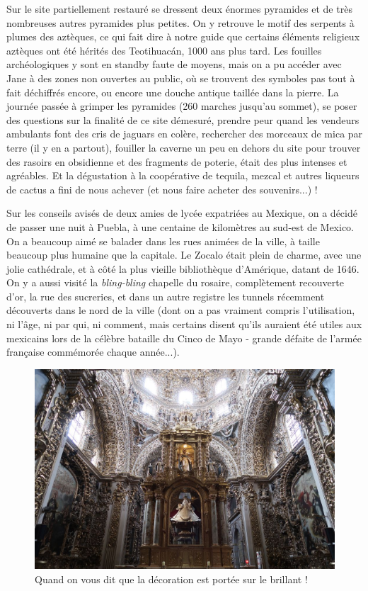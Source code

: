 Sur le site partiellement restauré se dressent deux énormes pyramides et
de très nombreuses autres pyramides plus petites. On y retrouve le motif
des serpents à plumes des aztèques, ce qui fait dire à notre guide que
certains éléments religieux aztèques ont été hérités des Teotihuacán,
1000 ans plus tard. Les fouilles archéologiques y sont en standby faute
de moyens, mais on a pu accéder avec Jane à des zones non ouvertes au
public, où se trouvent des symboles pas tout à fait déchiffrés encore,
ou encore une douche antique taillée dans la pierre. La journée passée à
grimper les pyramides (260 marches jusqu'au sommet), se poser des
questions sur la finalité de ce site démesuré, prendre peur quand les
vendeurs ambulants font des cris de jaguars en colère, rechercher des
morceaux de mica par terre (il y en a partout), fouiller la caverne un
peu en dehors du site pour trouver des rasoirs en obsidienne et des
fragments de poterie, était des plus intenses et agréables. Et la
dégustation à la coopérative de tequila, mezcal et autres liqueurs de
cactus a fini de nous achever (et nous faire acheter des souvenirs...) !

Sur les conseils avisés de deux amies de lycée expatriées au Mexique, on
a décidé de passer une nuit à Puebla, à une centaine de kilomètres au
sud-est de Mexico. On a beaucoup aimé se balader dans les rues animées
de la ville, à taille beaucoup plus humaine que la capitale. Le Zocalo
était plein de charme, avec une jolie cathédrale, et à côté la plus
vieille bibliothèque d'Amérique, datant de 1646. On y a aussi visité la
\emph{bling-bling} chapelle du rosaire, complètement recouverte d'or, la
rue des sucreries, et dans un autre registre les tunnels récemment
découverts dans le nord de la ville (dont on a pas vraiment compris
l'utilisation, ni l'âge, ni par qui, ni comment, mais certains disent
qu'ils auraient été utiles aux mexicains lors de la célèbre bataille du
Cinco de Mayo - grande défaite de l'armée française commémorée chaque
année...).

\begin{figure}
\centering
\includegraphics{images/20180930_rosario.JPG}
\caption{Quand on vous dit que la décoration est portée sur le brillant
!}
\end{figure}

